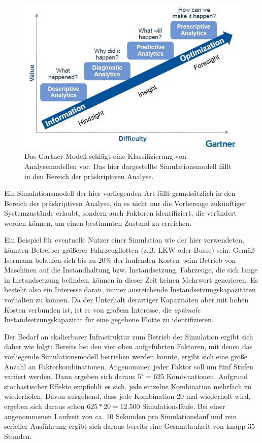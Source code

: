 \documentclass[11pt,a4paper]{article}
\begin{document}
\begin{figure}
	\label{fig:gartner-modell}
	\centering
	\includegraphics[width=\textwidth]{media/analytic-maturity.png}
	\caption{
		Das Gartner Modell schlägt eine Klassifizierung von Analysemodellen vor.
		Das hier dargestellte Simulationsmodell fällt in den Bereich der 
		präskriptiven Analyse. 
	}
\end{figure}

Ein Simulationsmodell der hier vorliegenden Art fällt grundsätzlich in den Bereich der präskriptiven Analyse, 
da es nicht nur die Vorhersage zukünftiger Systemzustände erlaubt, sondern auch Faktoren identifiziert,
die verändert werden können, um einen bestimmten Zustand zu erreichen.

Ein Beispiel für eventuelle Nutzer einer Simulation wie der hier verwendeten, könnten 
Betreiber größerer Fahrzeugflotten (z.B. LKW oder Busse) sein. 
Gemäß Isermann \cite{Isermann_2011} belaufen sich bis zu 20\% der laufenden Kosten beim Betrieb von Maschinen auf
die Instandhaltung bzw. Instandsetzung.
Fahrzeuge, die sich lange in Instandsetzung befinden, können in dieser Zeit keinen Mehrwert generieren.
Es besteht also ein Interesse daran, immer ausreichende Instandsetzungskapazitäten vorhalten zu können.
Da der Unterhalt derartiger Kapazitäten aber mit hohen Kosten verbunden ist, ist es von großem
Interesse, die \emph{optimale} Instandsetzungskapazität für eine gegebene Flotte zu identifizieren.

Der Bedarf an skalierbarer Infrastruktur zum Betrieb der Simulation ergibt sich daher wie folgt:
Bereits bei den vier oben aufgeführten Faktoren, mit denen das vorliegende Simulationsmodell betrieben werden könnte,
ergibt sich eine große Anzahl an Faktorkombinationen.
Angenommen jeder Faktor soll um fünf Stufen variiert werden. Dann ergeben sich daraus
$5^4 = 625$ Kombinationen. Aufgrund stochastischer Effekte empfiehlt es sich, jede einzelne
Kombination mehrfach zu wiederholen. Davon ausgehend, dass jede Kombination 20 mal wiederholt wird,
ergeben sich daraus schon $625 * 20 = 12.500$ Simulationsläufe. Bei einer angenommenen Laufzeit von ca. 10 Sekunden
pro Simulationslauf und rein serieller Ausführung ergibt sich daraus bereits eine Gesamtlaufzeit von
knapp 35 Stunden.
\end{document}
